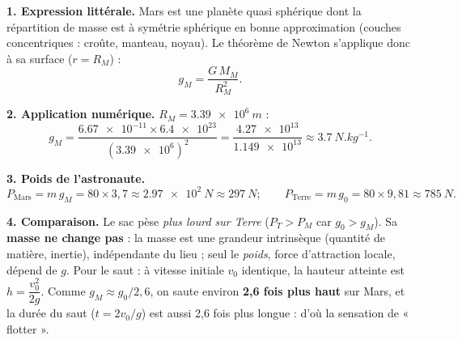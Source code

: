 \documentclass[11pt]{article}
\begin{document}
\begin{corrige}
\textbf{1. Expression littérale.} Mars est une planète quasi sphérique dont la répartition de masse est à symétrie sphérique en bonne approximation (couches concentriques : croûte, manteau, noyau). Le théorème de Newton s'applique donc à sa surface ($r = R_M$) :
\[
g_M = \frac{G\,M_M}{R_M^2}.
\]

\textbf{2. Application numérique.} $R_M = \SI{3,39e6}{m}$ :
\[
g_M = \frac{\num{6,67e-11}\times\num{6,4e23}}{(\num{3,39e6})^2} = \frac{\num{4,27e13}}{\num{1,149e13}} \approx \SI{3,7}{N.kg^{-1}}.
\]

\textbf{3. Poids de l'astronaute.}
\[
P_{\text{Mars}} = m\,g_M = 80\times 3,7 \approx \SI{2,97e2}{N} \approx \SI{297}{N} ;
\qquad
P_{\text{Terre}} = m\,g_0 = 80\times 9,81 \approx \SI{785}{N}.
\]

\textbf{4. Comparaison.} Le sac pèse \emph{plus lourd sur Terre} ($P_T > P_M$ car $g_0 > g_M$). Sa \textbf{masse ne change pas} : la masse est une grandeur intrinsèque (quantité de matière, inertie), indépendante du lieu ; seul le \emph{poids}, force d'attraction locale, dépend de $g$.
Pour le saut : à vitesse initiale $v_0$ identique, la hauteur atteinte est $h = \dfrac{v_0^2}{2g}$. Comme $g_M \approx g_0/2,6$, on saute environ \textbf{2,6 fois plus haut} sur Mars, et la durée du saut ($t = 2v_0/g$) est aussi 2,6 fois plus longue : d'où la sensation de « flotter ».
\end{corrige}
\end{document}
